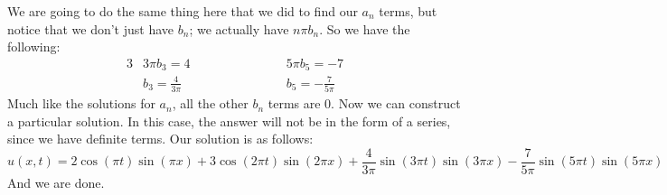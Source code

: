 \documentclass{article}
\begin{document}
\noindent We are going to do the same thing here that we did to find our $a_{n}$ terms, but notice that we don't just have $b_{n}$; we actually have $n\pi b_{n}$. So we have the following:
\begin{alignat*}{3}
&3\pi b_{3} = 4 \qquad \qquad \qquad &&5\pi b_{5} = -7\\
&b_{3} = \frac{4}{3\pi} &&b_{5} = -\frac{7}{5\pi}
\end{alignat*}
\noindent Much like the solutions for $a_{n}$, all the other $b_{n}$ terms are 0. Now we can construct a particular solution. In this case, the answer will not be in the form of a series, since we have definite terms. Our solution is as follows:
\[
u(x,t) = 2\cos{(\pi t)}\sin{(\pi x)} + 3\cos{(2\pi t)}\sin{(2\pi x)} + \frac{4}{3\pi}\sin{(3\pi t)}\sin{(3\pi x)} - \frac{7}{5\pi}\sin{(5\pi t)}\sin{(5\pi x)}
\]
\noindent And we are done.
\newpage
\end{document}
